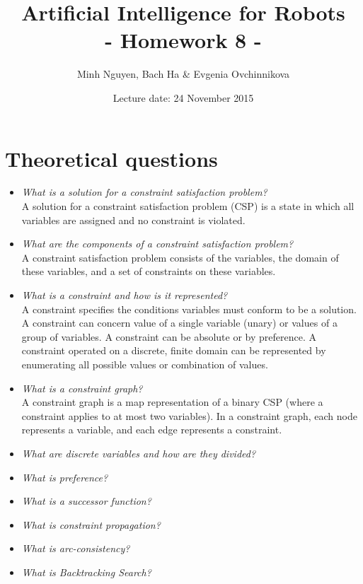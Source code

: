 \documentclass[a4paper, 12pt]{article}
\title{Artificial Intelligence for Robots \\
				- Homework 8 -}
\author{Minh Nguyen, Bach Ha \& Evgenia Ovchinnikova}
\date{Lecture date: 24 November 2015}
\begin{document}
\maketitle

\section{Theoretical questions}

    \begin{itemize}
        \item \emph{What is a solution for a constraint satisfaction problem?}\\
            A solution for a constraint satisfaction problem (CSP) is a state in
            which all variables are assigned and no constraint is violated.
        \item \emph{What are the components of a constraint satisfaction problem?}\\
            A constraint satisfaction problem consists of the variables, the
            domain of these variables, and a set of constraints on these variables.
        \item \emph{What is a constraint and how is it represented?}\\
            A constraint specifies the conditions variables must conform to be a
            solution. A constraint can concern value of a single variable (unary)
            or values of a group of variables. A constraint can be absolute or
            by preference. A constraint operated on a discrete, finite domain
            can be represented by enumerating all possible values or combination
            of values.
        \item \emph{What is a constraint graph?}\\
            A constraint graph is a map representation of a binary CSP (where a
            constraint applies to at most two variables). In a constraint graph,
            each node represents a variable, and each edge represents a constraint.
        \item \emph{What are discrete variables and how are they divided?}
        \item \emph{What is preference?}
        \item \emph{What is a successor function?}
        \item \emph{What is constraint propagation?}
        \item \emph{What is arc-consistency?}
        \item \emph{What is Backtracking Search?}
    \end{itemize}
\end{document}
